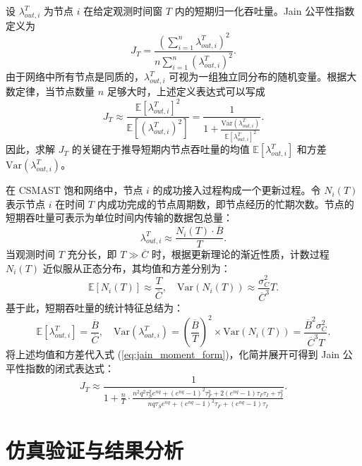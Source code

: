 设 $\lambda_{out, i}^T$ 为节点 $i$ 在给定观测时间窗 $T$ 内的短期归一化吞吐量。Jain 公平性指数定义为
\begin{equation}
	J_T = \frac{\left(\sum_{i=1}^n \lambda_{out, i}^T\right)^2}{n \sum_{i=1}^n \left(\lambda_{out, i}^T\right)^2}.
\end{equation}
由于网络中所有节点是同质的，$\lambda_{out, i}^T$ 可视为一组独立同分布的随机变量。根据大数定律，当节点数量 $n$ 足够大时，上述定义表达式可以写成
\begin{equation}
	\label{eq:jain_moment_form}
	J_T \approx \frac{\mathbb{E}[\lambda_{out, i}^T]^2}{\mathbb{E}[(\lambda_{out, i}^T)^2]} = \frac{1}{1 + \frac{\text{Var}(\lambda_{out, i}^T)}{\mathbb{E}[\lambda_{out, i}^T]^2}}.
\end{equation}
因此，求解 $J_T$ 的关键在于推导短期内节点吞吐量的均值 $\mathbb{E}[\lambda_{out, i}^T]$ 和方差 $\text{Var}(\lambda_{out, i}^T)$。

在 CSMAST 饱和网络中，节点 $i$ 的成功接入过程构成一个更新过程。令 $N_i(T)$ 表示节点 $i$ 在时间 $T$ 内成功完成的节点周期数，即节点经历的忙期次数。节点的短期吞吐量可表示为单位时间内传输的数据包总量：
\begin{equation}
	\lambda_{out, i}^T \approx \frac{N_i(T) \cdot \overline{B}}{T}.
\end{equation}
当观测时间 $T$ 充分长，即 $T \gg \overline{C}$ 时，根据更新理论的渐近性质\cite{1996_Gausian}，计数过程 $N_i(T)$ 近似服从正态分布，其均值和方差分别为：
\begin{equation}
	\mathbb{E}[N_i(T)] \approx \frac{T}{\overline{C}}, \quad \text{Var}(N_i(T)) \approx \frac{\sigma^2_C}{\overline{C}^3} T.
\end{equation}
基于此，短期吞吐量的统计特征总结为：
\begin{equation}
	\mathbb{E}[\lambda_{out, i}^T] = \frac{\overline{B}}{\overline{C}}, \quad \text{Var}(\lambda_{out, i}^T) = \left( \frac{\overline{B}}{T} \right)^2 \times \text{Var}(N_i(T)) = \frac{\overline{B}^2 \sigma^2_C}{\overline{C}^3 T}.
\end{equation}
将上述均值和方差代入式 (\ref{eq:jain_moment_form})，化简并展开可得到 Jain 公平性指数的闭式表达式：
\begin{equation}
	\label{eq:jain_explicit}
	J_T \approx \frac{1}{1 + \frac{n}{T} \cdot \frac{n^2 q^2 \tau_S^2 e^{nq} + (e^{nq}-1)^2 \tau_F^2 + 2(e^{nq}-1)\tau_F \tau_I + \tau_I^2}{nq \tau_S e^{nq} + (e^{nq}-1)^2 \tau_F + (e^{nq}-1)\tau_I}}.
\end{equation}
\section{仿真验证与结果分析}
\label{sec:simulation_results}


